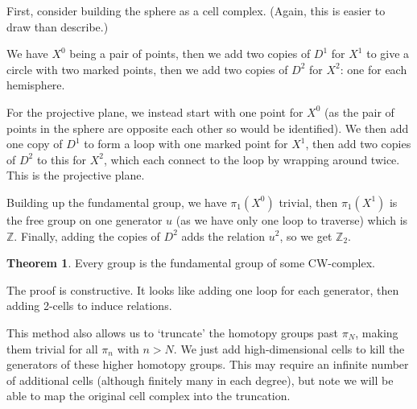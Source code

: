 \documentclass[a4paper,12pt]{article}
\newcommand{\ZZ}{\mathbb{Z}}
\theoremstyle{definition}
\newtheorem*{thm}{Theorem}
\begin{document}
First, consider building the sphere as a cell complex.
(Again, this is easier to draw than describe.)

We have $X^0$ being a pair of points, then we add two copies of $D^1$ for $X^1$ to give a circle with two marked points, then we add two copies of $D^2$ for $X^2$: one for each hemisphere.

For the projective plane, we instead start with one point for $X^0$ (as the pair of points in the sphere are opposite each other so would be identified).
We then add one copy of $D^1$ to form a loop with one marked point for $X^1$, then add two copies of $D^2$ to this for $X^2$, which each connect to the loop by wrapping around twice.
This is the projective plane.

Building up the fundamental group, we have $\pi_1(X^0)$ trivial, then $\pi_1(X^1)$ is the free group on one generator $u$ (as we have only one loop to traverse) which is $\ZZ$.
Finally, adding the copies of $D^2$ adds the relation $u^2$, so we get $\ZZ_2$.

\begin{thm}
Every group is the fundamental group of some CW-complex.
\end{thm}

The proof is constructive. It looks like adding one loop for each generator, then adding 2-cells to induce relations.

This method also allows us to `truncate' the homotopy groups past $\pi_N$, making them trivial for all $\pi_n$ with $n > N$.
We just add high-dimensional cells to kill the generators of these higher homotopy groups.
This may require an infinite number of additional cells (although finitely many in each degree), but note we will be able to map the original cell complex into the truncation.
\end{document}
